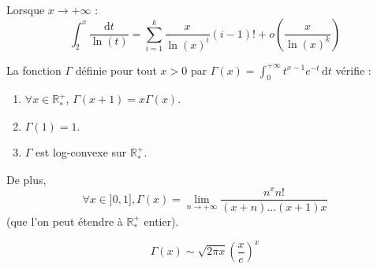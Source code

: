	
	\begin{example}
		Lorsque $x \rightarrow +\infty$ :
		\[ \int_{2}^{x} \frac{\mathrm{d}t}{\ln(t)} = \sum_{i=1}^k \frac{x}{\ln(x)^i} (i-1)! + o \left( \frac{x}{\ln(x)^k} \right) \]
	\end{example}
	
	
	\begin{proposition}
		La fonction $\Gamma$ définie pour tout $x > 0$ par $\Gamma(x) = \int_0^{+\infty} t^{x-1} e^{-t} \, \mathrm{d}t$ vérifie :
		\begin{enumerate}[label=(\roman*)]
			\item $\forall x \in \mathbb{R}^+_*$, $\Gamma(x+1) = x\Gamma(x)$.
			\item $\Gamma(1) = 1$.
			\item $\Gamma$ est log-convexe sur $\mathbb{R}^+_*$.
		\end{enumerate}
		De plus,
		\[ \forall x \in ]0, 1], \Gamma(x) = \lim_{n \rightarrow +\infty} \frac{n^x n!}{(x+n) \dots (x+1)x} \]
		(que l'on peut étendre à $\mathbb{R}^+_*$ entier).
	\end{proposition}
	
	
	\begin{theorem}
		\[ \Gamma(x) \sim \sqrt{2\pi x} \left( \frac{x}{e} \right)^x \]
	\end{theorem}

